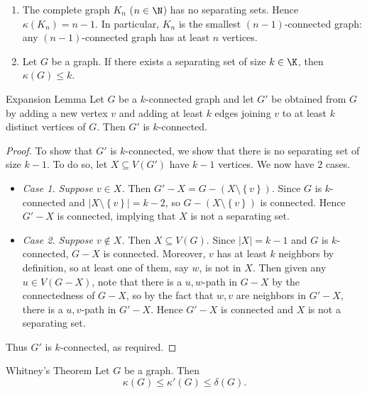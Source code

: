 \documentclass[co342]{subfiles}
\begin{document}
    \np
    \begin{enumerate}
        \item The complete graph $K_n$ ($n\in\N$) has no separating sets. Hence $\kappa\left( K_n \right) = n-1$. In particular, $K_n$ is the smallest $\left(n-1 \right)$-connected graph: any $\left( n-1 \right)$-connected graph has at least $n$ vertices.
        \item Let $G$ be a graph. If there exists a separating set of size $k\in\K$, then $\kappa\left( G \right) \leq k$.
    \end{enumerate}

    \begin{theorem}{Expansion Lemma}
        Let $G$ be a $k$-connected graph and let $G'$ be obtained from $G$ by adding a new vertex $v$ and adding at least $k$ edges joining $v$ to at least $k$ distinct vertices of $G$. Then $G'$ is $k$-connected.
    \end{theorem}

    \begin{proof}
        To show that $G'$ is $k$-connected, we show that there is no separating set of size $k-1$. To do so, let $X\subseteq V\left( G' \right)$ have $k-1$ vertices. We now have $2$ cases.
        \begin{itemize}
            \item \textit{Case 1. Suppose $v\in X$.} Then $G'-X = G-\left( X\setminus \left\lbrace v \right\rbrace  \right)$. Since $G$ is $k$-connected and $\left| X\setminus \left\lbrace v \right\rbrace  \right| = k-2$, so $G-\left( X\setminus \left\lbrace v \right\rbrace  \right)$ is connected. Hence $G'-X$ is connected, implying that $X$ is not a separating set.
            \item \textit{Case 2. Suppose $v\notin X$.} Then $X\subseteq V\left( G \right)$. Since $\left| X \right| = k-1$ and $G$ is $k$-connected, $G-X$ is connected. Moreover, $v$ has at least $k$ neighbors by definition, so at least one of them, say $w$, is not in $X$. Then given any $u\in V\left( G-X \right)$, note that there is a $u,w$-path in $G-X$ by the connectedness of $G-X$, so by the fact that $w,v$ are neighbors in $G'-X$, there is a $u,v$-path in $G'-X$. Hence $G'-X$ is connected and $X$ is not a separating set.
        \end{itemize} 
        Thus $G'$ is $k$-connected, as required.
    \end{proof}

    \begin{theorem}{Whitney's Theorem}
        Let $G$ be a graph. Then
        \begin{equation*}
            \kappa\left( G \right) \leq \kappa'\left( G \right) \leq \delta\left( G \right) .
        \end{equation*}
    \end{theorem}
\end{document}
